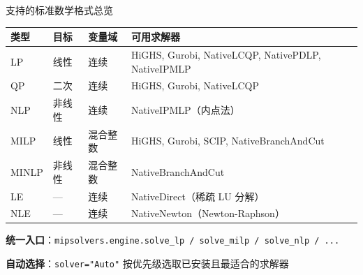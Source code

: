 \documentclass[10pt,aspectratio=169]{beamer}
\begin{document}
\begin{frame}{支持的标准数学格式总览}
  \begin{center}
  \footnotesize
  \begin{tabular}{@{}lllp{5.2cm}@{}}
    \toprule
    \textbf{类型} & \textbf{目标} & \textbf{变量域} & \textbf{可用求解器} \\
    \midrule
    LP    & 线性    & 连续   & HiGHS, Gurobi, NativeLCQP, NativePDLP, NativeIPMLP \\[2pt]
    QP    & 二次    & 连续   & HiGHS, Gurobi, NativeLCQP \\[2pt]
    NLP   & 非线性  & 连续   & NativeIPMLP（内点法） \\[2pt]
    MILP  & 线性    & 混合整数 & HiGHS, Gurobi, SCIP, NativeBranchAndCut \\[2pt]
    MINLP & 非线性  & 混合整数 & NativeBranchAndCut \\[2pt]
    LE    & ---     & 连续   & NativeDirect（稀疏 LU 分解）\\[2pt]
    NLE   & ---     & 连续   & NativeNewton（Newton-Raphson）\\
    \bottomrule
  \end{tabular}
  \end{center}

  \vspace{8pt}
  \textbf{统一入口}：\texttt{mipsolvers.engine.solve\_lp / solve\_milp / solve\_nlp / ...}

  \vspace{4pt}
  \textbf{自动选择}：\texttt{solver="Auto"} 按优先级选取已安装且最适合的求解器
\end{frame}
\end{document}
